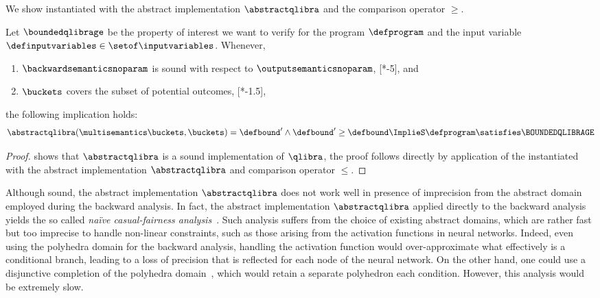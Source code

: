 We show  instantiated with the abstract implementation $\abstractqlibra$ and the comparison operator $\ge$.

\begin{theorem} 
  Let $\boundedqlibrage$ be the property of interest we want to verify for the program $\defprogram$ and the input variable $\definputvariables\in\setof\inputvariables$.
  Whenever,
  \begin{enumerate}[label=(\roman*)]
    \item $\backwardsemanticsnoparam$ is sound with respect to $\outputsemanticsnoparam$, \cf{} [*-5], and
    \item $\buckets$ covers the subset of potential outcomes, \cf{} [*-1.5],
\end{enumerate}
  the following implication holds:
  \begin{align*}
    \abstractqlibra(\multisemantics\buckets, \buckets) = \defbound' \land \defbound' \ge \defbound \ImplieS \defprogram \satisfies \BOUNDEDQLIBRAGE
  \end{align*}
\end{theorem}
\begin{proof}
   shows that $\abstractqlibra$ is a sound implementation of $\qlibra$, the proof follows directly by application of the  instantiated with the abstract implementation $\abstractqlibra$ and comparison operator $\le$.
\end{proof}

Although sound, the abstract implementation $\abstractqlibra$ does not work well in presence of imprecision from the abstract domain employed during the backward analysis.
In fact, the abstract implementation $\abstractqlibra$ applied directly to the backward analysis yields the so called \emph{na\"ive casual-fairness analysis}~.
Such analysis suffers from the choice of existing abstract domains, which are rather fast but too imprecise to handle non-linear constraints, such as those arising from the activation functions in neural networks.
Indeed, even using the polyhedra domain for the backward analysis, handling the \relu{} activation function would over-approximate what effectively is a conditional branch, leading to a loss of precision that is reflected for each node of the neural network.
On the other hand, one could use a disjunctive completion of the polyhedra domain~, which would retain a separate polyhedron each condition.
However, this analysis would be extremely slow.

